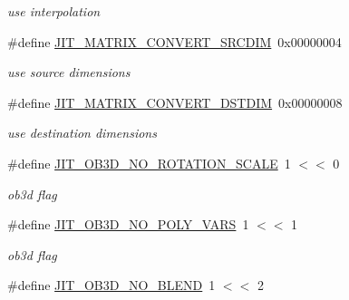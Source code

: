 \begin{DoxyCompactItemize}
\begin{DoxyCompactList}\small\item\em use interpolation \item\end{DoxyCompactList}\item 
\hypertarget{group__jitter_ga1893e85d59588d93923b0ee5ead9fd63}{
\#define \hyperlink{group__jitter_ga1893e85d59588d93923b0ee5ead9fd63}{JIT\_\-MATRIX\_\-CONVERT\_\-SRCDIM}~0x00000004}
\label{group__jitter_ga1893e85d59588d93923b0ee5ead9fd63}

\begin{DoxyCompactList}\small\item\em use source dimensions \item\end{DoxyCompactList}\item 
\hypertarget{group__jitter_ga1b1e7bf9ea9a7a839f68b243174b5692}{
\#define \hyperlink{group__jitter_ga1b1e7bf9ea9a7a839f68b243174b5692}{JIT\_\-MATRIX\_\-CONVERT\_\-DSTDIM}~0x00000008}
\label{group__jitter_ga1b1e7bf9ea9a7a839f68b243174b5692}

\begin{DoxyCompactList}\small\item\em use destination dimensions \item\end{DoxyCompactList}\item 
\hypertarget{group__jitter_gafc39daa7e259fa20f8fe918cb4892dc4}{
\#define \hyperlink{group__jitter_gafc39daa7e259fa20f8fe918cb4892dc4}{JIT\_\-OB3D\_\-NO\_\-ROTATION\_\-SCALE}~1 $<$$<$ 0}
\label{group__jitter_gafc39daa7e259fa20f8fe918cb4892dc4}

\begin{DoxyCompactList}\small\item\em ob3d flag \item\end{DoxyCompactList}\item 
\hypertarget{group__jitter_ga2eee6fc87f33ea672c921cddf960d5e1}{
\#define \hyperlink{group__jitter_ga2eee6fc87f33ea672c921cddf960d5e1}{JIT\_\-OB3D\_\-NO\_\-POLY\_\-VARS}~1 $<$$<$ 1}
\label{group__jitter_ga2eee6fc87f33ea672c921cddf960d5e1}

\begin{DoxyCompactList}\small\item\em ob3d flag \item\end{DoxyCompactList}\item 
\hypertarget{group__jitter_gab4407b5b96c0744f03bec69e204b56bb}{
\#define \hyperlink{group__jitter_gab4407b5b96c0744f03bec69e204b56bb}{JIT\_\-OB3D\_\-NO\_\-BLEND}~1 $<$$<$ 2}
\label{group__jitter_gab4407b5b96c0744f03bec69e204b56bb}


\end{DoxyCompactItemize}
